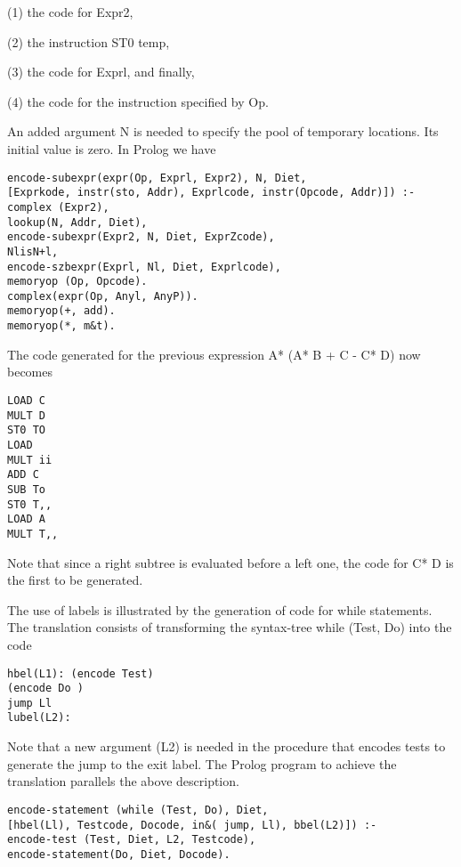 (1) the code for Expr2,

(2) the instruction ST0 temp,

(3) the code for Exprl, and finally,

(4) the code for the instruction specified by Op. 

An added argument N is needed to specify the pool of temporary locations. Its
initial value is zero. In Prolog we have
\begin{verbatim}
encode-subexpr(expr(Op, Exprl, Expr2), N, Diet,
[Exprkode, instr(sto, Addr), Exprlcode, instr(Opcode, Addr)]) :-
complex (Expr2),
lookup(N, Addr, Diet),
encode-subexpr(Expr2, N, Diet, ExprZcode),
NlisN+l,
encode-szbexpr(Exprl, Nl, Diet, Exprlcode),
memoryop (Op, Opcode).
complex(expr(Op, Anyl, AnyP)).
memoryop(+, add).
memoryop(*, m&t).
\end{verbatim}

The code generated for the previous expression A* (A* B + C - C* D) now
becomes
\begin{verbatim}
LOAD C
MULT D
ST0 TO
LOAD
MULT ii
ADD C
SUB To
ST0 T,,
LOAD A
MULT T,, 
\end{verbatim}
Note that since a right subtree is evaluated before a left one, the code for C* D
is the first to be generated. 

The use of labels is illustrated by the generation of code for while statements.
The translation consists of transforming the syntax-tree while (Test, Do) into the
code
\begin{verbatim}
hbel(L1): (encode Test)
(encode Do )
jump Ll
lubel(L2): 
\end{verbatim}

Note that a new argument (L2) is needed in the procedure that encodes tests
to generate the jump to the exit label. The Prolog program to achieve the
translation parallels the above description.
\begin{verbatim}
encode-statement (while (Test, Do), Diet,
[hbel(Ll), Testcode, Docode, in&( jump, Ll), bbel(L2)]) :-
encode-test (Test, Diet, L2, Testcode),
encode-statement(Do, Diet, Docode). 
\end{verbatim}

